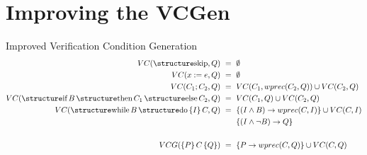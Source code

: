 \documentclass[aspectratio=169]{beamer}
\begin{document}
%  

\section*{Improving the VCGen}

\begin{slide}{Improved Verification Condition Generation}
\begin{align*}
VC(\kw{skip},Q) & ~=~ \emptyset\\
VC(x := e,Q)    & ~=~ \emptyset\\
VC(C_1;C_2,Q)   & ~=~ VC(C_1,wprec(C_2,Q)) \cup VC(C_2,Q)\\
VC(\kw{if}\,B\,\kw{then}\,C_1\,\kw{else}\,C_2,Q) & ~=~ VC(C_1,Q) \cup VC(C_2,Q)\\
VC(\kw{while}\,B\,\kw{do}\,\{I\}\,C,Q) & ~=~ \{ (I \land B) \to wprec(C,I) \} \cup VC(C,I)\\
& \:\:\:\:\:\:\:\:\:\{(I \land \neg B) \to Q\}\\
& \\
VCG(\{P\}\,C\,\{Q\}) & ~=~ \{P \to wprec(C,Q)\} \cup VC(C,Q)
\end{align*}
\end{slide}
\end{document}
